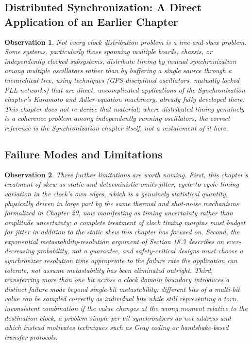 \documentclass[12pt]{article}
\newtheorem{observation}{Observation}
\begin{document}
\subsection{Distributed Synchronization: A Direct Application of an Earlier Chapter}

\begin{observation}
Not every clock distribution problem is a tree-and-skew problem. Some systems, particularly those spanning multiple boards, chassis, or independently clocked subsystems, distribute timing by mutual synchronization among multiple oscillators rather than by buffering a single source through a hierarchical tree, using techniques (GPS-disciplined oscillators, mutually locked PLL networks) that are direct, uncomplicated applications of the Synchronization chapter's Kuramoto and Adler-equation machinery, already fully developed there. This chapter does not re-derive that material; where distributed timing genuinely is a coherence problem among independently running oscillators, the correct reference is the Synchronization chapter itself, not a restatement of it here.
\end{observation}

\subsection{Failure Modes and Limitations}

\begin{observation}
Three further limitations are worth naming. First, this chapter's treatment of skew as static and deterministic omits jitter, cycle-to-cycle timing variation in the clock's own edges, which is a genuinely statistical quantity, physically driven in large part by the same thermal and shot-noise mechanisms formalized in Chapter 20, now manifesting as timing uncertainty rather than amplitude uncertainty; a complete treatment of clock timing margins must budget for jitter in addition to the static skew this chapter has focused on. Second, the exponential metastability-resolution argument of Section 18.3 describes an ever-decreasing probability, not a guarantee, and safety-critical designs must choose a synchronizer resolution time appropriate to the failure rate the application can tolerate, not assume metastability has been eliminated outright. Third, transferring more than one bit across a clock domain boundary introduces a distinct failure mode beyond single-bit metastability: different bits of a multi-bit value can be sampled correctly as individual bits while still representing a torn, inconsistent combination if the value changes at the wrong moment relative to the destination clock, a problem simple per-bit synchronizers do not address and which instead motivates techniques such as Gray coding or handshake-based transfer protocols.
\end{observation}
\end{document}
